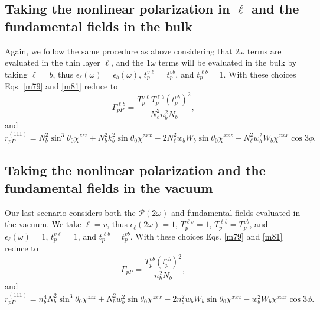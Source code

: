 
\subsection{Taking the nonlinear polarization in \texorpdfstring{$\ell$}{l} and
the fundamental fields in the bulk}\label{sec:hybrid}

Again, we follow the same procedure as above considering that $2\omega$ terms are evaluated in the thin layer $\ell$, and the $1\omega$ terms will be evaluated in the bulk by taking $\ell = b$, thus $\epsilon_{\ell}(\omega)=\epsilon_{b}(\omega)$, $t^{v\ell}_{p} = t^{vb}_{p}$, and $t^{\ell b}_{p} = 1$. With these choices Eqs. \eqref{m79} and \eqref{m81} reduce to
\begin{equation}
\Gamma^{\ell b}_{pP}=
\frac{T^{v\ell}_{p}T^{\ell b}_{p}\left(t^{vb}_{p}\right)^{2}}
  {N^{2}_{\ell}n^{2}_{b}N_{b}}
,
\end{equation}
and
\begin{equation}
r^{(111)}_{pP} = 
  N^{2}_{b}\sin^{3}\theta_{0}\chi^{zzz}
+ N^{2}_{b}k^{2}_{b}\sin\theta_{0}\chi^{zxx}
- 2N^{2}_{\ell}w_{b}W_{b}\sin\theta_{0}\chi^{xxz}
- N^{2}_{\ell}w^{2}_{b}W_{b}\chi^{xxx}\cos3\phi.
\end{equation}



\subsection{Taking the nonlinear polarization and the fundamental fields in the
vacuum}\label{sec:vacuum}

Our last scenario considers both the $\boldsymbol{\mathcal{P}}(2\omega)$ and fundamental fields evaluated in the vacuum. We take $\ell = v$, thus $\epsilon_{\ell}(2\omega)=1$, $T^{\ell v}_{p}=1$, $T^{\ell b}_{p} = T^{vb}_{p}$, and $\epsilon_{\ell}(\omega) = 1$, $t^{v\ell}_{p} = 1$, and $t^{\ell b}_{p} = t^{vb}_{p}$. With these choices Eqs. \eqref{m79} and \eqref{m81} reduce to
\begin{equation}
\Gamma_{pP} =
\frac{T^{v b}_{p}\left(t^{v b}_{p}\right)^{2}}
     {n^{2}_{b}N_{b}}
,
\end{equation}
and
\begin{equation}
r^{(111)}_{pP} =
  n^{4}_{b}N^{2}_{b}\sin^{3}\theta_{0}\chi^{zzz}
+ N^{2}_{b}w^{2}_{b}\sin\theta_{0}\chi^{zxx}
- 2n^{2}_{b}w_{b}W_{b}\sin\theta_{0}\chi^{xxz}
- w^{2}_{b}W_{b}\chi^{xxx}\cos3\phi.
\end{equation}

